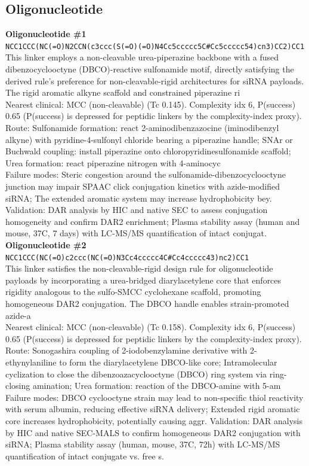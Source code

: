 \documentclass[10pt]{article}
\begin{document}
\subsection{Oligonucleotide}
\noindent\textbf{Oligonucleotide \#1} \\ \texttt{NCC1CCC(NC(=O)N2CCN(c3ccc(S(=O)(=O)N4Cc5ccccc5C\#Cc5ccccc54)cn3)CC2)CC1} \\ This linker employs a non-cleavable urea-piperazine backbone with a fused dibenzocyclooctyne (DBCO)-reactive sulfonamide motif, directly satisfying the derived rule's preference for non-cleavable-rigid architectures for siRNA payloads. The rigid aromatic alkyne scaffold and constrained piperazine ri \\ Nearest clinical: MCC (non-cleavable) (Tc 0.145). Complexity idx 6, P(success) 0.65 (P(success) is depressed for peptidic linkers by the complexity-index proxy). \\ Route: Sulfonamide formation: react 2-aminodibenzazocine (iminodibenzyl alkyne) with pyridine-4-sulfonyl chloride bearing a piperazine handle; SNAr or Buchwald coupling: install piperazine onto chloropyridinesulfonamide scaffold; Urea formation: react piperazine nitrogen with 4-aminocyc \\ Failure modes: Steric congestion around the sulfonamide-dibenzocyclooctyne junction may impair SPAAC click conjugation kinetics with azide-modified siRNA; The extended aromatic system may increase hydrophobicity bey. Validation: DAR analysis by HIC and native SEC to assess conjugation homogeneity and confirm DAR2 enrichment; Plasma stability assay (human and mouse, 37\textdegree{}C, 7 days) with LC-MS/MS quantification of intact conjugat. \\[0.4em]
\noindent\textbf{Oligonucleotide \#2} \\ \texttt{NCC1CCC(NC(=O)c2ccc(NC(=O)N3Cc4ccccc4C\#Cc4ccccc43)nc2)CC1} \\ This linker satisfies the non-cleavable-rigid design rule for oligonucleotide payloads by incorporating a urea-bridged diarylacetylene core that enforces rigidity analogous to the sulfo-SMCC cyclohexane scaffold, promoting homogeneous DAR2 conjugation. The DBCO handle enables strain-promoted azide-a \\ Nearest clinical: MCC (non-cleavable) (Tc 0.158). Complexity idx 6, P(success) 0.65 (P(success) is depressed for peptidic linkers by the complexity-index proxy). \\ Route: Sonogashira coupling of 2-iodobenzylamine derivative with 2-ethynylaniline to form the diarylacetylene DBCO-like core; Intramolecular cyclization to close the dibenzoazacyclooctyne (DBCO) ring system via ring-closing amination; Urea formation: reaction of the DBCO-amine with 5-am \\ Failure modes: DBCO cyclooctyne strain may lead to non-specific thiol reactivity with serum albumin, reducing effective siRNA delivery; Extended rigid aromatic core increases hydrophobicity, potentially causing aggr. Validation: DAR analysis by HIC and native SEC-MALS to confirm homogeneous DAR2 conjugation with siRNA; Plasma stability assay (human, mouse, 37\textdegree{}C, 72h) with LC-MS/MS quantification of intact conjugate vs. free s. \\[0.4em]
\end{document}
